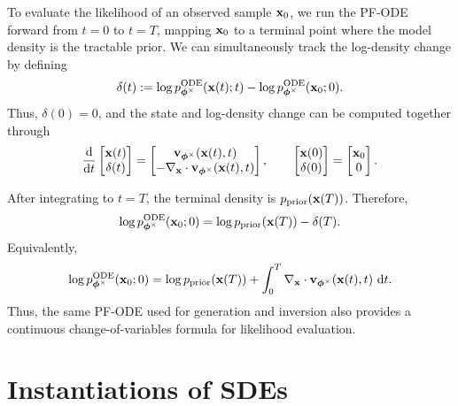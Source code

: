 To evaluate the likelihood of an observed sample ${\mathbf{x}}_0$, we run the PF-ODE
forward from $t=0$ to $t=T$, mapping ${\mathbf{x}}_0$ to a terminal point where the
model density is the tractable prior. We can simultaneously track the
log-density change by defining
\[
\delta(t)
:=
\log p^{\textup{ODE}}_{\bm{\phi}^\times}({\mathbf{x}}(t);t)
-
\log p^{\textup{ODE}}_{\bm{\phi}^\times}({\mathbf{x}}_0;0).
\]
Thus, $\delta(0)=0$, and the state and log-density change can be computed
together through
\begin{align}\label{eq:score-sde-likelihood}
\frac{\mathop{}\!\mathrm{d}}{\mathop{}\!\mathrm{d} t}
\begin{bmatrix}
{\mathbf{x}}(t)\\
\delta(t)
\end{bmatrix}
=
\begin{bmatrix}
{\mathbf{v}}_{\bm{\phi}^\times}({\mathbf{x}}(t),t)\\
-\nabla_{{\mathbf{x}}}\cdot
{\mathbf{v}}_{\bm{\phi}^\times}({\mathbf{x}}(t),t)
\end{bmatrix},
\qquad
\begin{bmatrix}
{\mathbf{x}}(0)\\
\delta(0)
\end{bmatrix}
=
\begin{bmatrix}
{\mathbf{x}}_0\\
0
\end{bmatrix}.
\end{align}

After integrating to $t=T$, the terminal density is
$p_{\mathrm{prior}}({\mathbf{x}}(T))$. Therefore,
\[
\log
p^{\textup{ODE}}_{\bm{\phi}^\times}({\mathbf{x}}_0;0)
=
\log p_{\mathrm{prior}}({\mathbf{x}}(T))
-
\delta(T).
\]
Equivalently,
\[
\log
p^{\textup{ODE}}_{\bm{\phi}^\times}({\mathbf{x}}_0;0)
=
\log p_{\mathrm{prior}}({\mathbf{x}}(T))
+
\int_0^T
\nabla_{{\mathbf{x}}}\cdot
{\mathbf{v}}_{\bm{\phi}^\times}({\mathbf{x}}(t),t)
\,\mathop{}\!\mathrm{d} t.
\]
Thus, the same PF-ODE used for generation and inversion also provides a
continuous change-of-variables formula for likelihood evaluation.



\newpage

\section{Instantiations of SDEs}\label{sec:instances}

